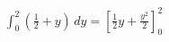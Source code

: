 \documentclass[preview]{standalone}
\begin{document}
\begin{align*}
\int_0^2 \left( \frac{1}{2} + y \right) \, dy = \left[ \frac{1}{2} y + \frac{y^2}{2} \right]_0^2
\end{align*}
\end{document}
